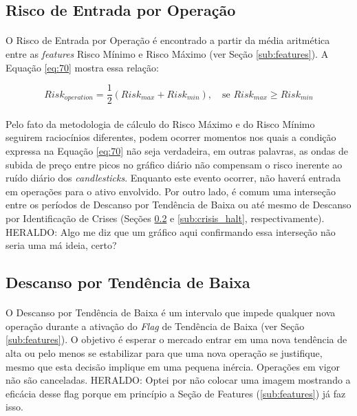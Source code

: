 \subsection{Risco de Entrada por Operação}

\paragraph{} O Risco de Entrada por Operação é encontrado a partir da média aritmética entre as \textit{features} Risco Mínimo e Risco Máximo (ver Seção \ref{sub:features}). A Equação \ref{eq:70} mostra essa relação:

\begin{equation} \label{eq:70}
    Risk_{operation} = \dfrac{1}{2}(Risk_{max} + Risk_{min}), \quad \textrm{se } Risk_{max} \ge Risk_{min}
\end{equation}

\paragraph{} Pelo fato da metodologia de cálculo do Risco Máximo e do Risco Mínimo seguirem raciocínios diferentes, podem ocorrer momentos nos quais a condição expressa na Equação \ref{eq:70} não seja verdadeira, em outras palavras, as ondas de subida de preço entre picos no gráfico diário não compensam o risco inerente ao ruído diário dos \textit{candlesticks}. Enquanto este evento ocorrer, não haverá entrada em operações para o ativo envolvido. Por outro lado, é comum uma interseção entre os períodos de Descanso por Tendência de Baixa ou até mesmo de Descanso por Identificação de Crises (Seções \ref{sub:downtrend_halt} e \ref{sub:crisis_halt}, respectivamente). \color{red} HERALDO: Algo me diz que um gráfico aqui confirmando essa interseção não seria uma má ideia, certo? 



\subsection{Descanso por Tendência de Baixa}
\label{sub:downtrend_halt}

\paragraph{} O Descanso por Tendência de Baixa é um intervalo que impede qualquer nova operação durante a ativação do \textit{Flag} de Tendência de Baixa (ver Seção \ref{sub:features}). O objetivo é esperar o mercado entrar em uma nova tendência de alta ou pelo menos se estabilizar para que uma nova operação se justifique, mesmo que esta decisão implique em uma pequena inércia. Operações em vigor não são canceladas. \color{red} HERALDO: Optei por não colocar uma imagem mostrando a eficácia desse flag porque em princípio a Seção de Features (\ref{sub:features}) já faz isso. 



